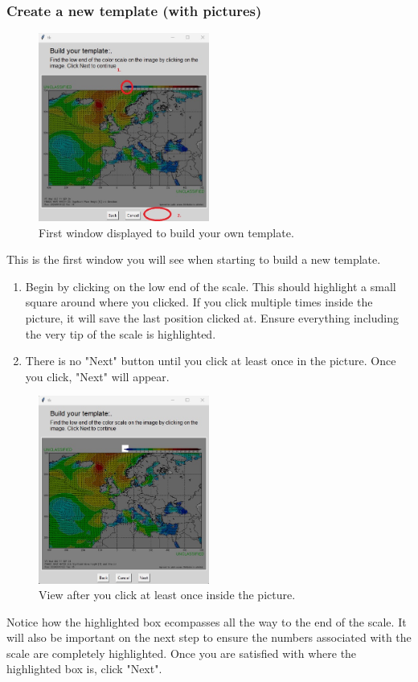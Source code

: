 \subsubsection{Create a new template (with pictures)}
\begin{figure}[H]
\centering\includegraphics[width=0.5\textwidth]{TeX/Build_Template1.jpg}
\caption{First window displayed to build your own template.}
\end{figure}
This is the first window you will see when starting to build a new template.
\begin{enumerate}
    \item Begin by clicking on the low end of the scale.  This should highlight a small square around where you clicked.  If you click multiple times inside the picture, it will save the last position clicked at.  Ensure everything including the very tip of the scale is highlighted.
    \item There is no "Next" button until you click at least once in the picture.  Once you click, "Next" will appear.
\end{enumerate}

\begin{figure}[H]
    \centering\includegraphics[width=0.5\textwidth]{TeX/Build_Template2.jpg}
    \caption{View after you click at least once inside the picture.}
\end{figure}
Notice how the highlighted box ecompasses all the way to the end of the scale. It will also be important on the next step to ensure the numbers associated with the scale are completely highlighted.  Once you are satisfied with where the highlighted box is, click "Next".

